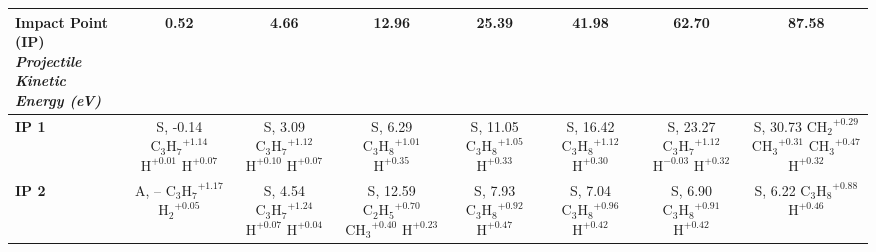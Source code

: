 
\begin{table}[t]
\centering
\renewcommand{\arraystretch}{1.2}
\setcellgapes{2pt}\makegapedcells
\begin{tabular}{lccccccc}
\toprule
\makecell{\textbf{Impact Point (IP)}\\\textit{Projectile Kinetic Energy (eV)}} & \textbf{0.52} & \textbf{4.66} & \textbf{12.96} & \textbf{25.39} & \textbf{41.98} & \textbf{62.70} & \textbf{87.58} \\
\midrule
\arrayrulecolor[gray]{0.75}
\textbf{IP 1} & \makecell{S, -0.14 \\ $\mathrm{C_3H_7}^{+1.14}$ \\ $\mathrm{H}^{+0.01}$ \\ $\mathrm{H}^{+0.07}$} & \makecell{S, 3.09 \\ $\mathrm{C_3H_7}^{+1.12}$ \\ $\mathrm{H}^{+0.10}$ \\ $\mathrm{H}^{+0.07}$} & \makecell{S, 6.29 \\ $\mathrm{C_3H_8}^{+1.01}$ \\ $\mathrm{H}^{+0.35}$} & \makecell{S, 11.05 \\ $\mathrm{C_3H_8}^{+1.05}$ \\ $\mathrm{H}^{+0.33}$} & \makecell{S, 16.42 \\ $\mathrm{C_3H_8}^{+1.12}$ \\ $\mathrm{H}^{+0.30}$} & \makecell{S, 23.27 \\ $\mathrm{C_3H_7}^{+1.12}$ \\ $\mathrm{H}^{-0.03}$ \\ $\mathrm{H}^{+0.32}$} & \makecell{S, 30.73 \\ $\mathrm{CH_2}^{+0.29}$ \\ $\mathrm{CH_3}^{+0.31}$ \\ $\mathrm{CH_3}^{+0.47}$ \\ $\mathrm{H}^{+0.32}$} \\
\midrule
\textbf{IP 2} & \makecell{A, -- \\ $\mathrm{C_3H_7}^{+1.17}$ \\ $\mathrm{H_2}^{+0.05}$} & \makecell{S, 4.54 \\ $\mathrm{C_3H_7}^{+1.24}$ \\ $\mathrm{H}^{+0.07}$ \\ $\mathrm{H}^{+0.04}$} & \makecell{S, 12.59 \\ $\mathrm{C_2H_5}^{+0.70}$ \\ $\mathrm{CH_3}^{+0.40}$ \\ $\mathrm{H}^{+0.23}$} & \makecell{S, 7.93 \\ $\mathrm{C_3H_8}^{+0.92}$ \\ $\mathrm{H}^{+0.47}$} & \makecell{S, 7.04 \\ $\mathrm{C_3H_8}^{+0.96}$ \\ $\mathrm{H}^{+0.42}$} & \makecell{S, 6.90 \\ $\mathrm{C_3H_8}^{+0.91}$ \\ $\mathrm{H}^{+0.42}$} & \makecell{S, 6.22 \\ $\mathrm{C_3H_8}^{+0.88}$ \\ $\mathrm{H}^{+0.46}$} \\

\end{tabular}
\end{table}
